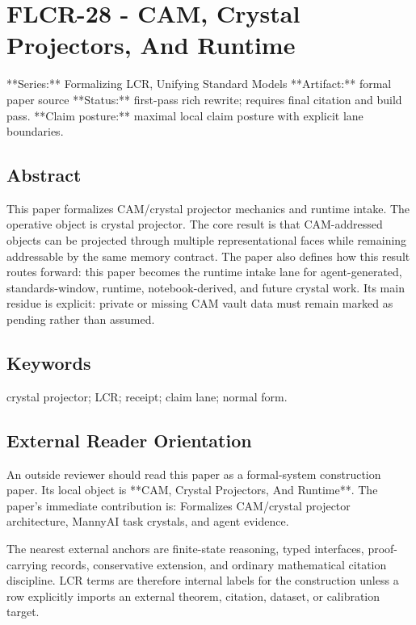 \documentclass[11pt]{article}
\begin{document}
\section*{FLCR-28 - CAM, Crystal Projectors, And Runtime}

**Series:** Formalizing LCR, Unifying Standard Models
**Artifact:** formal paper source
**Status:** first-pass rich rewrite; requires final citation and build pass.
**Claim posture:** maximal local claim posture with explicit lane boundaries.

\subsection*{Abstract}

This paper formalizes CAM/crystal projector mechanics and runtime intake. The operative object is crystal projector. The core result is that CAM-addressed objects can be projected through multiple representational faces while remaining addressable by the same memory contract. The paper also defines how this result routes forward: this paper becomes the runtime intake lane for agent-generated, standards-window, runtime, notebook-derived, and future crystal work. Its main residue is explicit: private or missing CAM vault data must remain marked as pending rather than assumed.

\subsection*{Keywords}

crystal projector; LCR; receipt; claim lane; normal form.

\subsection*{External Reader Orientation}

An outside reviewer should read this paper as a formal-system construction paper. Its local object is **CAM, Crystal Projectors, And Runtime**. The paper's immediate contribution is: Formalizes CAM/crystal projector architecture, MannyAI task crystals, and agent evidence.

The nearest external anchors are finite-state reasoning, typed interfaces, proof-carrying records, conservative extension, and ordinary mathematical citation discipline. LCR terms are therefore internal labels for the construction unless a row explicitly imports an external theorem, citation, dataset, or calibration target.
\end{document}
